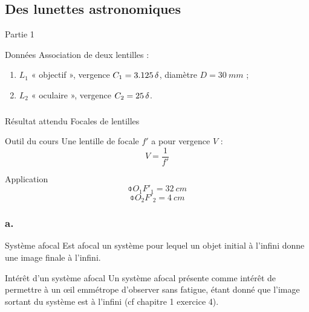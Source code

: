 \documentclass[10pt,a5paper,notitlepage]{book}
\begin{document}
\subsection{Des lunettes astronomiques}
\begin{center}
    \huge Partie 1
\end{center}

\pagebreak

\begin{vtcb}{Données}
    Association de deux lentilles :
    \begin{enumerate}
        \item $L_1$ « objectif », vergence $C_1 = \SI{3.125}{\delta}$, diamètre $D
            = \SI{30}{mm}$ ;
        \item $L_2$ « oculaire », vergence $C_2 = \SI{25}{\delta}$.
    \end{enumerate}
\end{vtcb}

\subsubsection{}

\begin{rtcb}{Résultat attendu}
    Focales de lentilles
\end{rtcb}

\begin{btcb}{Outil du cours}
    Une lentille de focale $f'$ a pour vergence $V$ :
    \[ V = \frac{1}{f'} \]
\end{btcb}

\begin{lgtcb}{Application}
    \[ \boxed{\obar{O_1F'_1} = \SI{32}{cm}} \]
    \[ \boxed{\obar{O_2F'_2} = \SI{4}{cm}} \]
\end{lgtcb}

\subsubsection{a.}
\begin{defi}{Système afocal}
    Est afocal un système pour lequel un objet initial à l'infini donne une
    image finale à l'infini.
\end{defi}

\begin{inte}{Intérêt d'un système afocal}
    Un système afocal présente comme intérêt de permettre à un œil emmétrope
    d'observer sans fatigue, étant donné que l'image sortant du système est à
    l'infini (cf chapitre 1 exercice 4).
\end{inte}
\end{document}
